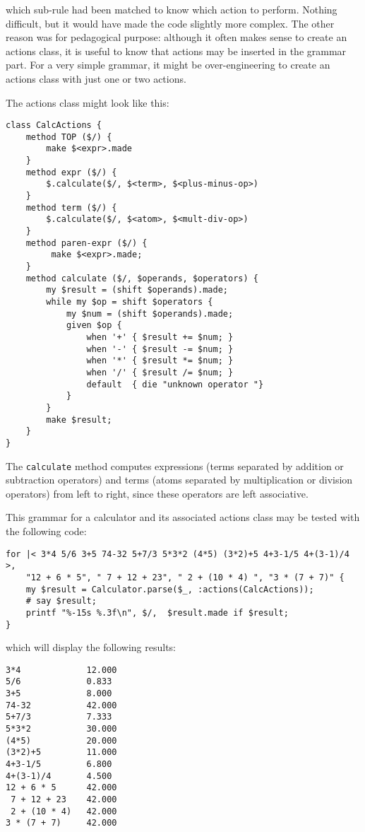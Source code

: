 which sub-rule had been matched to know which action to 
perform. Nothing difficult, but it would have made the  
code slightly more complex. The other reason was for pedagogical 
purpose: although it often makes sense to create an actions 
class, it is useful to know that actions may be inserted in the 
grammar part. For a very simple grammar, it might be 
over-engineering to create an actions class with just one or 
two actions.

The actions class might look like this:

\begin{verbatim}
class CalcActions {
    method TOP ($/) {
        make $<expr>.made
    }
    method expr ($/) {
        $.calculate($/, $<term>, $<plus-minus-op>)
    }
    method term ($/) {
        $.calculate($/, $<atom>, $<mult-div-op>)
    }
    method paren-expr ($/) {
         make $<expr>.made;
    }
    method calculate ($/, $operands, $operators) {
        my $result = (shift $operands).made;
        while my $op = shift $operators {
            my $num = (shift $operands).made;
            given $op {
                when '+' { $result += $num; }
                when '-' { $result -= $num; }
                when '*' { $result *= $num; }
                when '/' { $result /= $num; }
                default  { die "unknown operator "}
            }
        }
        make $result;
    }
}
\end{verbatim}

The {\tt calculate} method computes expressions (terms 
separated by addition or subtraction operators) and terms 
(atoms separated by multiplication or division operators) 
from left to right, since these operators are left associative.

This grammar for a calculator and its associated actions class 
may be tested with the following code:

\begin{verbatim}
for |< 3*4 5/6 3+5 74-32 5+7/3 5*3*2 (4*5) (3*2)+5 4+3-1/5 4+(3-1)/4 >,
    "12 + 6 * 5", " 7 + 12 + 23", " 2 + (10 * 4) ", "3 * (7 + 7)" { 
    my $result = Calculator.parse($_, :actions(CalcActions));
    # say $result;
    printf "%-15s %.3f\n", $/,  $result.made if $result;
}
\end{verbatim}

which will display the following results:

\begin{verbatim}
3*4             12.000
5/6             0.833
3+5             8.000
74-32           42.000
5+7/3           7.333
5*3*2           30.000
(4*5)           20.000
(3*2)+5         11.000
4+3-1/5         6.800
4+(3-1)/4       4.500
12 + 6 * 5      42.000
 7 + 12 + 23    42.000
 2 + (10 * 4)   42.000
3 * (7 + 7)     42.000
\end{verbatim}

